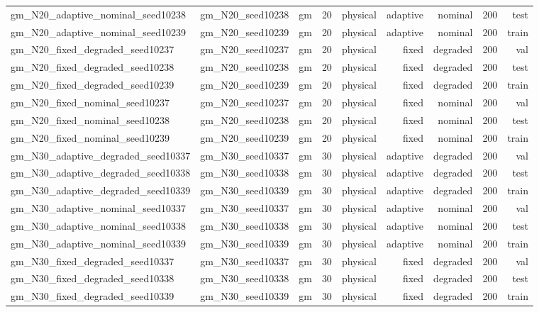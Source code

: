 \begin{tabular}{lrrrrrrrr}
gm\_N20\_adaptive\_nominal\_seed10238 & gm\_N20\_seed10238 & gm & 20 & physical & adaptive & nominal & 200 & test \\
gm\_N20\_adaptive\_nominal\_seed10239 & gm\_N20\_seed10239 & gm & 20 & physical & adaptive & nominal & 200 & train \\
gm\_N20\_fixed\_degraded\_seed10237 & gm\_N20\_seed10237 & gm & 20 & physical & fixed & degraded & 200 & val \\
gm\_N20\_fixed\_degraded\_seed10238 & gm\_N20\_seed10238 & gm & 20 & physical & fixed & degraded & 200 & test \\
gm\_N20\_fixed\_degraded\_seed10239 & gm\_N20\_seed10239 & gm & 20 & physical & fixed & degraded & 200 & train \\
gm\_N20\_fixed\_nominal\_seed10237 & gm\_N20\_seed10237 & gm & 20 & physical & fixed & nominal & 200 & val \\
gm\_N20\_fixed\_nominal\_seed10238 & gm\_N20\_seed10238 & gm & 20 & physical & fixed & nominal & 200 & test \\
gm\_N20\_fixed\_nominal\_seed10239 & gm\_N20\_seed10239 & gm & 20 & physical & fixed & nominal & 200 & train \\
gm\_N30\_adaptive\_degraded\_seed10337 & gm\_N30\_seed10337 & gm & 30 & physical & adaptive & degraded & 200 & val \\
gm\_N30\_adaptive\_degraded\_seed10338 & gm\_N30\_seed10338 & gm & 30 & physical & adaptive & degraded & 200 & test \\
gm\_N30\_adaptive\_degraded\_seed10339 & gm\_N30\_seed10339 & gm & 30 & physical & adaptive & degraded & 200 & train \\
gm\_N30\_adaptive\_nominal\_seed10337 & gm\_N30\_seed10337 & gm & 30 & physical & adaptive & nominal & 200 & val \\
gm\_N30\_adaptive\_nominal\_seed10338 & gm\_N30\_seed10338 & gm & 30 & physical & adaptive & nominal & 200 & test \\
gm\_N30\_adaptive\_nominal\_seed10339 & gm\_N30\_seed10339 & gm & 30 & physical & adaptive & nominal & 200 & train \\
gm\_N30\_fixed\_degraded\_seed10337 & gm\_N30\_seed10337 & gm & 30 & physical & fixed & degraded & 200 & val \\
gm\_N30\_fixed\_degraded\_seed10338 & gm\_N30\_seed10338 & gm & 30 & physical & fixed & degraded & 200 & test \\
gm\_N30\_fixed\_degraded\_seed10339 & gm\_N30\_seed10339 & gm & 30 & physical & fixed & degraded & 200 & train \\

\end{tabular}
